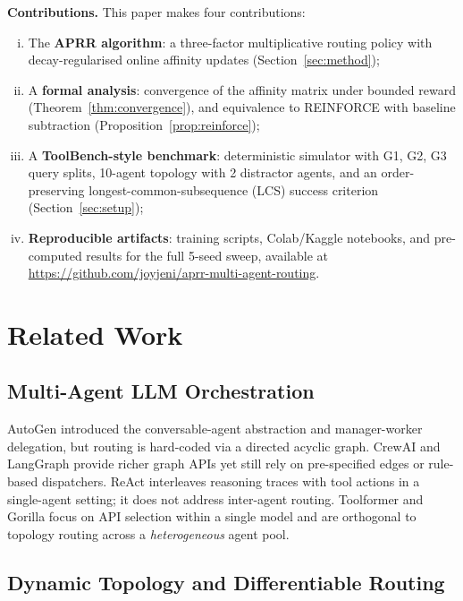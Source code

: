 \documentclass[journal,twocolumn,letterpaper]{IEEEtran}
\newcommand{\APRR}{\textsc{APRR}}
\begin{document}
\noindent\textbf{Contributions.}  This paper makes four contributions:
\begin{enumerate}[(i)]
  \item The \textbf{\APRR{} algorithm}: a three-factor multiplicative routing
        policy with decay-regularised online affinity updates
        (Section~\ref{sec:method});
  \item A \textbf{formal analysis}: convergence of the affinity matrix under
        bounded reward (Theorem~\ref{thm:convergence}), and equivalence to
        REINFORCE with baseline subtraction (Proposition~\ref{prop:reinforce});
  \item A \textbf{ToolBench-style benchmark}: deterministic simulator with G1,
        G2, G3 query splits, 10-agent topology with 2 distractor agents, and an
        order-preserving longest-common-subsequence (LCS) success criterion
        (Section~\ref{sec:setup});
  \item \textbf{Reproducible artifacts}: training scripts, Colab/Kaggle
        notebooks, and pre-computed results for the full 5-seed sweep,
        available at \url{https://github.com/joyjeni/aprr-multi-agent-routing}.
\end{enumerate}

\section{Related Work}
\label{sec:related}

\subsection{Multi-Agent LLM Orchestration}

AutoGen \cite{wu2023autogen} introduced the conversable-agent abstraction and
manager-worker delegation, but routing is hard-coded via a directed acyclic
graph.  CrewAI \cite{joao2023crewai} and LangGraph
\cite{chase2023langchain} provide richer graph APIs yet still rely on
pre-specified edges or rule-based dispatchers.
ReAct \cite{yao2022react} interleaves reasoning traces with tool actions in a
single-agent setting; it does not address inter-agent routing.
Toolformer \cite{schick2023toolformer} and Gorilla \cite{patil2023gorilla}
focus on API selection within a single model and are orthogonal to topology
routing across a \emph{heterogeneous} agent pool.

\subsection{Dynamic Topology and Differentiable Routing}
\end{document}
